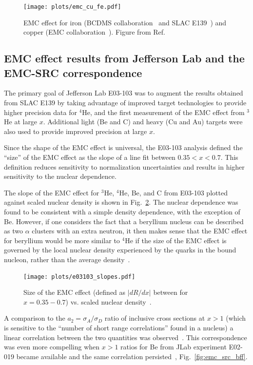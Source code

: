 \begin{figure}[htb]
  \texttt{[image: plots/emc\_cu\_fe.pdf]}
  \caption{EMC effect for iron (BCDMS collaboration~\cite{Benvenuti:1987az} and SLAC E139~\cite{Gomez:1993ri})
    and copper (EMC collaboration~\cite{Ashman:1992kv}).
    Figure from Ref.~\cite{Guzey:2012yk}}
  \label{fig:emc_iron}
\end{figure}

\subsection{EMC effect results from Jefferson Lab and the EMC-SRC correspondence}

The primary goal of Jefferson Lab E03-103 was to augment the results obtained from SLAC E139 by taking
advantage of improved target technologies to provide higher precision data for $^4$He, and the first
measurement of the EMC effect from $^3$He at large $x$.  Additional light (Be and C) and heavy (Cu and Au)
targets were also used to provide improved precision at large $x$.

Since the shape of the EMC effect is universal, the E03-103 analysis defined the ``size'' of the EMC
effect as the slope of a line fit between $0.35<x<0.7$.  This definition reduces sensitivity to
normalization uncertainties and results in higher sensitivity to the nuclear dependence.

The slope of the EMC effect for $^3$He, $^4$He, Be, and C from E03-103 plotted against scaled nuclear
density is shown in Fig.~\ref{fig:emc_jlab_hallc}.  The nuclear dependence was found to be consistent
with a simple density dependence, with the exception of Be. However, if one considers the fact that a
beryllium nucleus can be described as two $\alpha$ clusters with an extra neutron, it then makes sense
that the EMC effect for beryllium would be more similar to $^4$He if the size of the EMC effect is
governed by the local nuclear density experienced by the quarks in the bound nucleon, rather than the
average density~\cite{Seely:2009gt}.

\begin{figure}[htb]
  \texttt{[image: plots/e03103\_slopes.pdf]}
  \caption{Size of the EMC effect (defined as $|dR/dx|$ between for $x=0.35-0.7$) vs. scaled nuclear
    density~\cite{Seely:2009gt}.}
  \label{fig:emc_jlab_hallc}
\end{figure}

A comparison to the $a_2=\sigma_A/\sigma_D$ ratio of
inclusive cross sections at $x>1$ (which is sensitive to the ``number of short range correlations''
found in a nucleus) a linear correlation between the two quantities was observed~\cite{Weinstein:2010rt}.
This correspondence was even more compelling when $x>1$ ratios for Be from JLab experiment E02-019 became
available and the same correlation persisted~\cite{Arrington:2012ax, Hen:2012fm}, Fig.~\ref{fig:emc_src_bff}.

